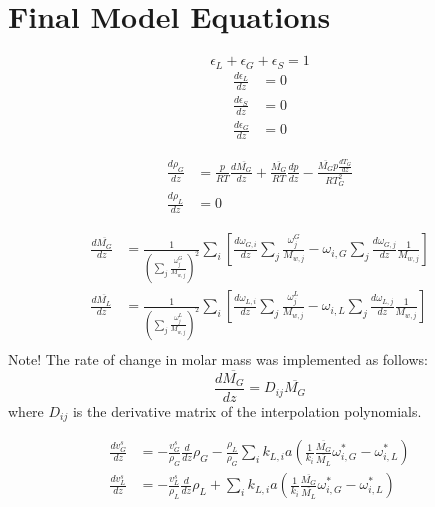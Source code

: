 \documentclass{article}
\begin{document}
\section{Final Model Equations}

\begin{equation}
	\epsilon_L + \epsilon_G + \epsilon_S = 1
\end{equation}
\begin{equation}
	\begin{split}
	\frac{d \epsilon_L}{dz} &= 0 \\
	\frac{d \epsilon_S}{dz} &= 0 \\
	\frac{d \epsilon_G}{dz} &= 0
	\end{split}
\end{equation}

\begin{equation}
	\begin{split}
		\frac{d \rho_G}{dz} &= \frac{p}{RT}\frac{d\overline{M_G}}{dz} + \frac{\overline{M_G}}{RT}\frac{dp}{dz} - \frac{\overline{M_G}p \frac{dT_G}{dz}}{R T_G^2} \\
		\frac{d \rho_L}{dz} &= 0
	\end{split}
\end{equation}

\begin{equation}
	\begin{split}
		\frac{d \overline{M_G}}{dz} &= \frac{1}{\left(\sum_j \frac{\omega_j^G}{M_{w,j}}\right)^2}\sum_i\left[\frac{d\omega_{G,i}}{dz} \sum_j\frac{\omega_j^G}{M_{w,j}} - \omega_{i,G}\sum_j \frac{d\omega_{G,j}}{dz}\frac{1}{M_{w,j}} \right] \\
		\frac{d \overline{M_L}}{dz} &= \frac{1}{\left(\sum_j \frac{\omega_j^L}{M_{w,j}}\right)^2}\sum_i\left[\frac{d\omega_{L,i}}{dz} \sum_j\frac{\omega_j^L}{M_{w,j}} - \omega_{i,L}\sum_j \frac{d\omega_{L,j}}{dz}\frac{1}{M_{w,j}} \right] \\
	\end{split}
\end{equation}
Note! The rate of change in molar mass was implemented as follows:
\begin{equation}
	\frac{d \overline{M_G}}{dz} = D_{ij}\overline{M_G}
\end{equation}
where $D_{ij}$ is the derivative matrix of the interpolation polynomials. 

\begin{equation}
	\begin{split}
		\frac{dv_G^s}{dz} &= -\frac{v_G^s}{\rho_G}\frac{d}{dz}\rho_G - \frac{\rho_L}{\rho_G}\sum_ik_{L,i}a(\frac{1}{k_i}\frac{\overline{M_G}}{\overline{M_L}}\omega_{i,G}^*-\omega_{i,L}^*)\\
		\frac{dv_L^s}{dz} &= -\frac{v_L^s}{\rho_L}\frac{d}{dz}\rho_L + \sum_ik_{L,i}a(\frac{1}{k_i}\frac{\overline{M_G}}{\overline{M_L}}\omega_{i,G}^*-\omega_{i,L}^*)
	\end{split}
\end{equation}
\end{document}
